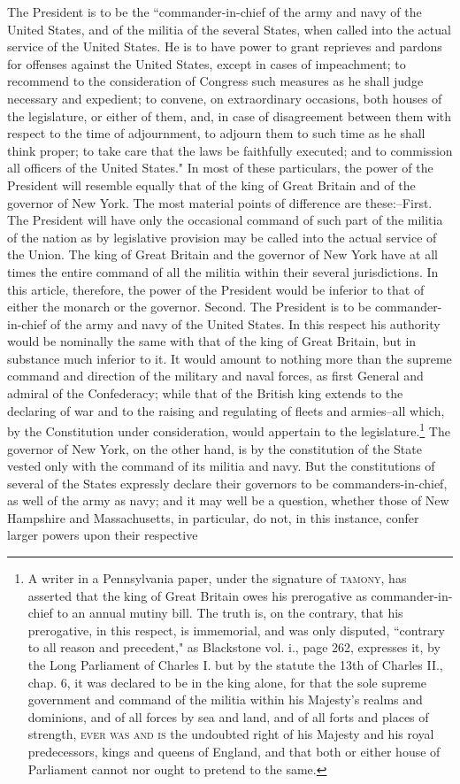 The President is to be the ``commander-in-chief of the army and navy of the United States, and of the militia of the several States, when called into the actual service of the United States. He is to have power to grant reprieves and pardons for offenses against the United States, except in cases of impeachment; to recommend to the consideration of Congress such measures as he shall judge necessary and expedient; to convene, on extraordinary occasions, both houses of the legislature, or either of them, and, in case of disagreement between them with respect to the time of adjournment, to adjourn them to such time as he shall think proper; to take care that the laws be faithfully executed; and to commission all officers of the United States." In most of these particulars, the power of the President will resemble equally that of the king of Great Britain and of the governor of New York. The most material points of difference are these:--First. The President will have only the occasional command of such part of the militia of the nation as by legislative provision may be called into the actual service of the Union. The king of Great Britain and the governor of New York have at all times the entire command of all the militia within their several jurisdictions. In this article, therefore, the power of the President would be inferior to that of either the monarch or the governor. Second. The President is to be commander-in-chief of the army and navy of the United States. In this respect his authority would be nominally the same with that of the king of Great Britain, but in substance much inferior to it. It would amount to nothing more than the supreme command and direction of the military and naval forces, as first General and admiral of the Confederacy; while that of the British king extends to the declaring of war and to the raising and regulating of fleets and armies--all which, by the Constitution under consideration, would appertain to the legislature.\footnote{A writer in a Pennsylvania paper, under the signature of \textsc{tamony}, has asserted that the king of Great Britain owes his prerogative as commander-in-chief to an annual mutiny bill. The truth is, on the contrary, that his prerogative, in this respect, is immemorial, and was only disputed, ``contrary to all reason and precedent," as Blackstone vol. i., page 262, expresses it, by the Long Parliament of Charles I. but by the statute the 13th of Charles II., chap. 6, it was declared to be in the king alone, for that the sole supreme government and command of the militia within his Majesty's realms and dominions, and of all forces by sea and land, and of all forts and places of strength, \textsc{ever was and is} the undoubted right of his Majesty and his royal predecessors, kings and queens of England, and that both or either house of Parliament cannot nor ought to pretend to the same.} The governor of New York, on the other hand, is by the constitution of the State vested only with the command of its militia and navy. But the constitutions of several of the States expressly declare their governors to be commanders-in-chief, as well of the army as navy; and it may well be a question, whether those of New Hampshire and Massachusetts, in particular, do not, in this instance, confer larger powers upon their respective 